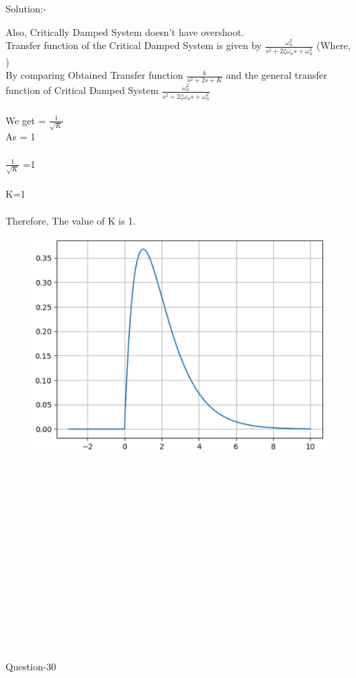 \documentclass[journal,12pt,twocolumn]{IEEEtran}
\begin{document}
\begin{frame}{Solution:- }
\begin{frame}{}
Also, Critically Damped System doesn't have overshoot.\\
Transfer function of the Critical Damped System is given by
\(\frac{\omega_n^2}{s^2+2\zeta\omega_ns +\omega_n^2}\) (Where, )\\
By comparing Obtained Transfer function \(\frac{k}{s^2+2s+K}\) and the general transfer function of Critical Damped System \(\frac{\omega_n^2}{s^2+2\zeta\omega_ns +\omega_n^2}\)\\
\vspace{5mm}\\
We get \zeta = \(\frac{1}{\sqrt{K}}\)\\
As \zeta = 1\\
\vspace{5mm}\\
\(\frac{1}{\sqrt{K}}\) =1\\
\vspace{5mm}\\
K=1\\
\vspace{5mm}\\
Therefore, The value of K is 1.\\




\end{frame}
\begin{frame}{}
\begin{figure}[h]
    \includegraphics[scale=0.65]{./figs/fig-6.eps}
    
\end{figure}
\\\\
\\\\
\end{frame}
\\\\\\\\
\\\\\\\\\
\begin{frame}{Question-30 }
\begin{block}


\end{block}
\end{frame}
\end{frame}
\end{document}
